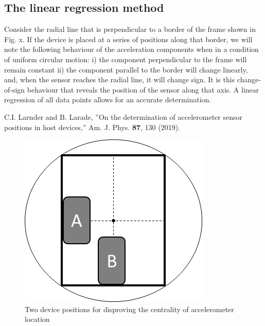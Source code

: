 \documentclass[prb,preprint]{revtex4-1}
\begin{document}
\subsection{The linear regression method}

Consider the radial line that is perpendicular to a border of the frame shown in Fig. x. If the device is placed at a series of positions along that border, we will note the following behaviour of the acceleration components when in a condition of uniform circular motion:
i) the component perpendicular to the frame will remain constant ii) the component parallel to the border will change linearly, and, when the sensor reaches the radial line, it will change sign.
It is this change-of-sign behaviour that reveals the position of the sensor along that axis. A linear regression of all data points allows for an accurate determination.





\begin{thebibliography}{5}


C.I. Larnder and B. Larade,
''On the determination of accelerometer sensor positions in host devices,''
Am. J. Phys.
\textbf{87}, 130 (2019).


\end{thebibliography}

\begin{figure} [h]
\includegraphics[width=14 cm]{TwoPositions}
\centering
\caption{Two device positions for disproving the centrality of accelerometer location }
\label{fig:TwoPositions}
\end{figure}
\end{document}
